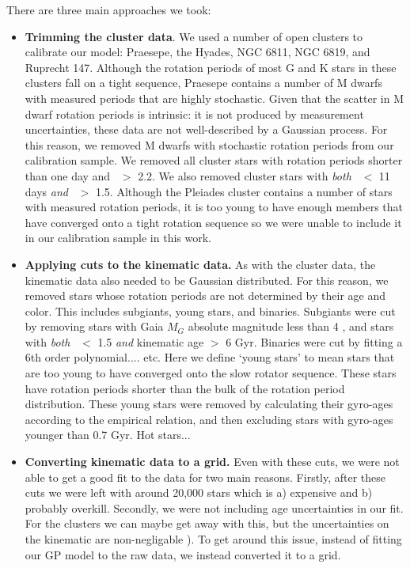 There are three main approaches we took:
\begin{itemize}
\item {\bf Trimming the cluster data}.
We used a number of open clusters to calibrate our model: Praesepe, the
Hyades, NGC 6811, NGC 6819, and Ruprecht 147.
Although the rotation periods of most G and K stars in these clusters fall on
a tight sequence, Praesepe contains a number of M dwarfs with measured periods
that are highly stochastic.
Given that the scatter in M dwarf rotation periods is intrinsic: it is not
produced by measurement uncertainties, these data are not well-described by a
Gaussian process.
For this reason, we removed M dwarfs with stochastic rotation periods from our
calibration sample.
We removed all cluster stars with rotation periods shorter than one day and
\gcolor\ $>$ 2.2.
We also removed cluster stars with {\it both} \prot\ $<$ 11 days {\it and}
\gcolor\ $>$ 1.5.
Although the Pleiades cluster contains a number of stars with measured
rotation periods, it is too young to have enough members that have converged
onto a tight rotation sequence so we were unable to include it in our
calibration sample in this work.

\item {\bf Applying cuts to the kinematic data.}
As with the cluster data, the kinematic data also needed to be Gaussian
distributed.
For this reason, we removed stars whose rotation periods are not
determined by their age and color.
This includes subgiants, young stars, and binaries.
Subgiants were cut by removing stars with Gaia $M_G$ absolute magnitude less
than 4 , and stars with {\it both} \gcolor\ $<$ 1.5 {\it
and} kinematic age $>$ 6 Gyr.
Binaries were cut by fitting a 6th order polynomial.... etc.
Here we define `young stars' to mean stars that are too young to have
converged onto the slow rotator sequence.
These stars have rotation periods shorter than the bulk of the rotation period
distribution.
These young stars were removed by calculating their gyro-ages according to the
\citet{angus2019} empirical relation, and then excluding stars with gyro-ages
younger than 0.7 Gyr.
Hot stars...

\item {\bf Converting kinematic data to a grid.}
Even with these cuts, we were not able to get a good fit to the data for two
main reasons.
Firstly, after these cuts we were left with around 20,000 stars which is a)
expensive and b) probably overkill.
Secondly, we were not including age uncertainties in our fit.
For the clusters we can maybe get away with this, but the uncertainties on the
kinematic are non-negligable \citep[likely 1-2 Gyr][]{lu2021}).
To get around this issue, instead of fitting our GP model to the raw data, we
instead converted it to a grid.
\end{itemize}

